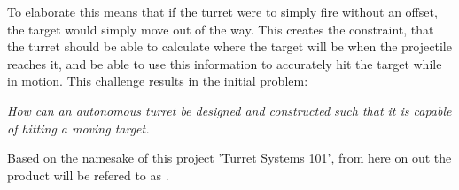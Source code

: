 To elaborate this means that if the turret were to simply fire without an
offset, the target would simply move out of the way. This creates the
constraint, that the turret should be able to calculate where the target will be
when the projectile reaches it, and be able to use this information to
accurately hit the target while in motion. This challenge results in the initial
problem:

\begin{center}
\begin{minipage}{0.8\linewidth}
\textit{How can an autonomous turret be designed and constructed such that it is
capable of hitting a moving target.}
\end{minipage}
\end{center}

Based on the namesake of this project 'Turret Systems 101', from here on out the
product will be refered to as \namep.
